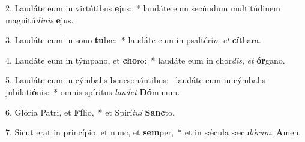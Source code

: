 2. Laudáte eum in virtútibus \textbf{e}jus:~*  laudáte eum secúndum multitúdinem magnitú\textit{di}\textit{nis} \textbf{e}jus.\

3. Laudáte eum in sono \textbf{tu}bæ:~*  laudáte eum in psaltéri\textit{o}, \textit{et} \textbf{cí}thara.\

4. Laudáte eum in týmpano, et \textbf{cho}ro:~*  laudáte eum in chor\textit{dis}, \textit{et} \textbf{ór}gano.\

5. Laudáte eum in cýmbalis benesonántibus: \dag\  laudáte eum in cýmbalis jubilati\textbf{ó}nis:~*  omnis spíritus \textit{lau}\textit{det} \textbf{Dó}minum.\

6. Glória Patri, et \textbf{Fí}lio,~*  et Spirí\textit{tu}\textit{i} \textbf{Sanc}to.\

7. Sicut erat in princípio, et nunc, et \textbf{sem}per,~*  et in sǽcula sæcu\textit{ló}\textit{rum}. \textbf{A}men.\

